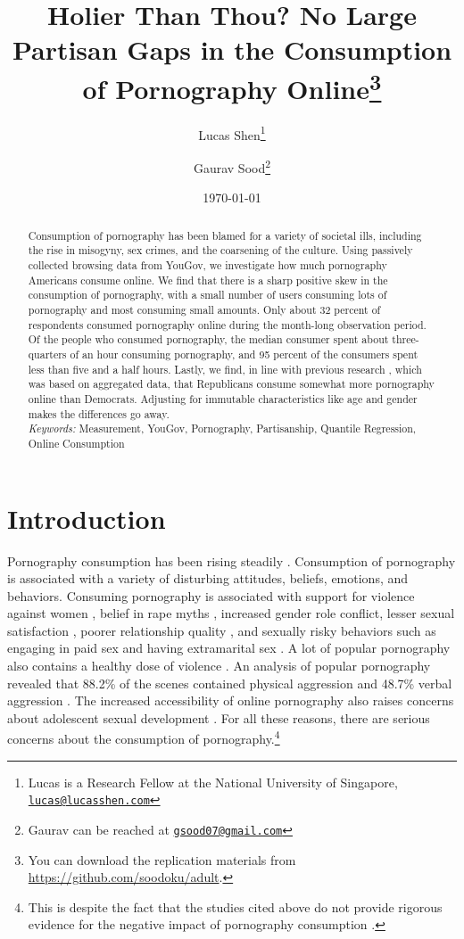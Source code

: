 \documentclass[12pt, letterpaper]{article}
\title{Holier Than Thou? No Large Partisan Gaps in the Consumption of Pornography Online\thanks{You can download the replication materials from \href{http://github.com/soodoku/adult}{https://github.com/soodoku/adult}.}
}
\author{Lucas Shen\thanks{Lucas is a Research Fellow at the National University of Singapore, \href{mailto:lucas@lucasshen.com}{\footnotesize{\texttt{lucas@lucasshen.com}}}} \and Gaurav Sood\thanks{Gaurav can be reached at \href{mailto:gsood07@gmail.com}{\footnotesize{\texttt{gsood07@gmail.com}}}}\vspace{.5cm}}
\date{\today}
\begin{document}
\maketitle

\thispagestyle{empty}
\begin{abstract}
\noindent Consumption of pornography has been blamed for a variety of societal ills, including the rise in misogyny, sex crimes, and the coarsening of the culture. Using passively collected browsing data from YouGov, we investigate how much pornography Americans consume online. We find that there is a sharp positive skew in the consumption of pornography, with a small number of users consuming lots of pornography and most consuming small amounts. Only about 32 percent of respondents consumed pornography online during the month-long observation period. Of the people who consumed pornography, the median consumer spent about three-quarters of an hour consuming pornography, and 95 percent of the consumers spent less than five and a half hours. Lastly, we find, in line with previous research \citep{macinnis2015american, edelman2009markets}, which was based on aggregated data, that Republicans consume somewhat more pornography online than Democrats. Adjusting for immutable characteristics like age and gender makes the differences go away.\\

\emph{Keywords:} Measurement, YouGov, Pornography, Partisanship, Quantile Regression, Online Consumption
\end{abstract} 
\clearpage
\setcounter{page}{1}
\doublespace
\section{Introduction}\label{sec:intro}
Pornography consumption has been rising steadily  \citep{Perry2018-cw, Price2016-sm, Wright2013-gl}. Consumption of pornography is associated with a variety of disturbing attitudes, beliefs, emotions, and behaviors. Consuming pornography is associated with support for violence against women \citep{hald2010pornography, malamuth2012pornography, donnerstein1984pornography}, belief in rape myths \citep{foubert2011pornography}, increased gender role conflict, lesser sexual satisfaction \citep{szymanski2014psychological, stewart2012young}, poorer relationship quality \citep{szymanski2014psychological, szymanski2015male}, and sexually risky behaviors such as engaging in paid sex and having extramarital sex \citep{wright2012internet}. A lot of popular pornography also contains a healthy dose of violence \citep{Vera-Gray2021-qv}. An analysis of popular pornography revealed that 88.2\% of the scenes contained physical aggression and 48.7\% verbal aggression \citep{bridges2010aggression}. The increased accessibility of online pornography also raises concerns about adolescent sexual development \citep{Peter2016-de, Ybarra2005-id}. For all these reasons, there are serious concerns about the consumption of pornography.\footnote{This is despite the fact that the studies cited above do not provide rigorous evidence for the negative impact of pornography consumption \citep{Ferguson2022-fo, Pathmendra2023-fx, Peter2016-de}.}
\end{document}
